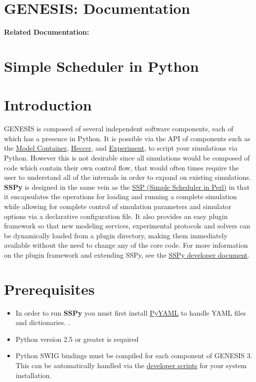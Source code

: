 \documentclass[12pt]{article}
\begin{document}
\section*{GENESIS: Documentation}

{\bf Related Documentation:}

\section*{Simple Scheduler in Python}

\section*{Introduction}

	GENESIS is composed of several independent software components, each of which has a presence in Python. It is possible via the API of components such as the \href{../model-container/model-container.tex}{Model Container}, \href{../heccer/heccer.tex}{Heccer}, and \href{../experiment/experiment.tex}{Experiment}, to script your simulations via Python. However this is not desirable since all simulations would be composed of code which contain their own control flow, that would often times require the user to understand all of the internals in order to expand on existing simulations. {\bf SSPy} is designed in the same vein as the \href{../ssp/ssp.tex}{SSP (Simple Scheduler in Perl)} in that it encapsulates the operations for loading and running a complete simulation while allowing for complete control of simulation parameters and simulator options via a declarative configuration file. It also provides an easy plugin framework so that new modeling services, experimental protocols and solvers can be dynamically loaded from a plugin directory, making them immediately available without the need to change any of the core code.  For more information on the plugin framework and extending SSPy, see the \href{../sspy-developer/sspy-developer.tex} {SSPy developer document}.


\section*{Prerequisites}

\begin{itemize}
\item In order to run {\bf SSPy} you must first install \href{http://pyyaml.org/}{PyYAML} to handle YAML files and dictionaries. .

\item Python version 2.5 or greater is required

\item Python SWIG bindings must be compiled for each component of GENESIS 3. This can be automatically handled via the \href{developer-installation/developer-installation.tex}{developer scripts} for your system installation.
\end{itemize}
\end{document}
